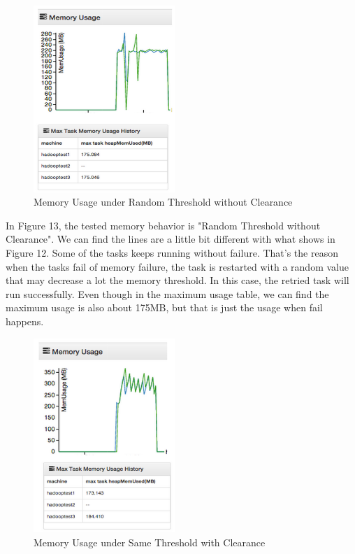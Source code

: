 \begin{figure}[ht]
  \centering
    \includegraphics[width=2.1in]{image/test1b.png}
    \caption{Memory Usage under Random Threshold without Clearance}
    \label{ref:memory_allocation}
\end{figure}

In Figure 13, the tested memory behavior is "Random Threshold without Clearance". We can find the lines are a little bit different with what shows in Figure 12. Some of the tasks keeps running without failure. That's the reason when the tasks fail of memory failure, the task is restarted with a random value that may decrease a lot the memory threshold. In this case, the retried task will run successfully. Even though in the maximum usage table, we can find the maximum usage is also about 175MB, but that is just the usage when fail happens.

\begin{figure}[ht]
  \centering
    \includegraphics[width=2.1in]{image/test1c.png}
    \caption{Memory Usage under Same Threshold with Clearance}
    \label{ref:memory_allocation}
\end{figure}

